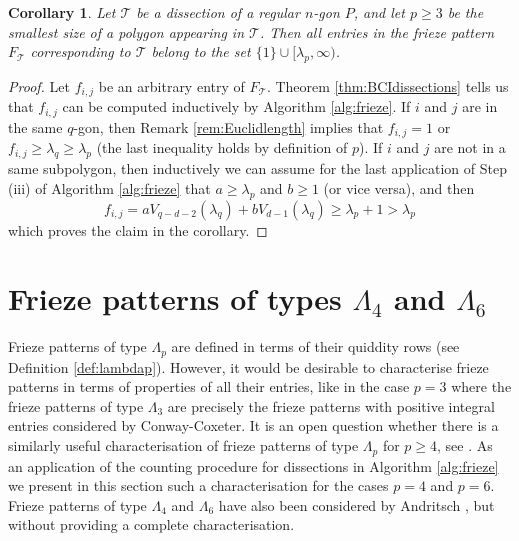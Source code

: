 \documentclass[11pt,a4paper]{amsart}
\newtheorem{Corollary}[Lemma]{Corollary}
\theoremstyle{definition}
\numberwithin{equation}{section}
\begin{document}
\begin{Corollary} \label{cor:ge1}
Let $\mathcal{T}$ be a dissection of a regular $n$-gon $P$, and let $p\ge 3$ be the smallest size of a polygon
appearing in $\mathcal{T}$. Then all entries in the frieze pattern $F_{\mathcal{T}}$ corresponding to $\mathcal{T}$ 
belong to the set $\{1\}\cup [\lambda_p,\infty)$. 
\end{Corollary}

\begin{proof} 
Let $f_{i,j}$ be an arbitrary entry of $F_{\mathcal{T}}$. Theorem \ref{thm:BCIdissections} tells us that 
$f_{i,j}$ can be computed inductively by Algorithm \ref{alg:frieze}. If $i$ and $j$ are in the same $q$-gon, 
then Remark \ref{rem:Euclidlength} implies that $f_{i,j}=1$ or $f_{i,j}\ge \lambda_q\ge \lambda_p$
(the last inequality holds by definition of $p$). If $i$ and $j$ are not in a same subpolygon, then 
inductively we can assume for the last application of 
Step (iii) of Algorithm \ref{alg:frieze} that $a\ge \lambda_p$ and $b\ge 1$ (or vice versa),
and then 
$$f_{i,j} = aV_{q-d-2}(\lambda_q) + bV_{d-1}(\lambda_q) \ge 
\lambda_p+1> \lambda_p$$
which proves the claim in the corollary. 
\end{proof}






\section{Frieze patterns of types $\Lambda_4$ and $\Lambda_6$}
\label{sec:lambda46}

Frieze patterns of type $\Lambda_p$ are defined in terms of their quiddity rows (see Definition 
\ref{def:lambdap}). However, it would be desirable to characterise frieze patterns in terms of properties of
all their entries, like in the case $p=3$ where the frieze patterns of type $\Lambda_3$ are 
precisely the frieze patterns with positive integral entries considered by Conway-Coxeter. 
It is an open question whether there is a similarly useful characterisation of frieze patterns of
type $\Lambda_p$ for $p\ge 4$, see \cite[Section 7]{HJ17}. As an application of the counting 
procedure for dissections in Algorithm \ref{alg:frieze} we present in this section such a characterisation 
for the cases $p=4$ and $p=6$. Frieze patterns of type $\Lambda_4$ and $\Lambda_6$ have 
also been considered by Andritsch \cite{A20}, but without providing a complete characterisation.
\medskip
\end{document}
